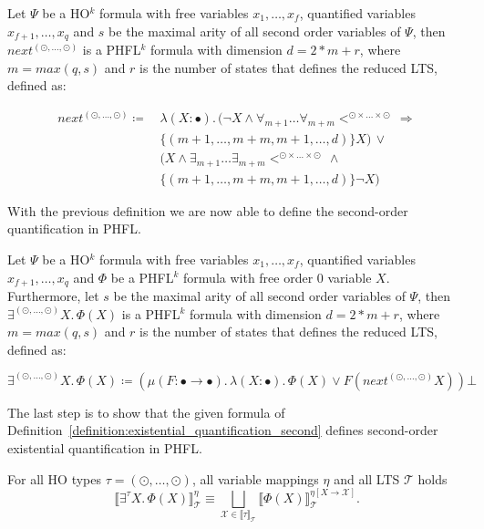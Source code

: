 \begin{definition}
    \label{definition:lower_bounds_next_second}
    Let $\Psi$ be a HO$^k$ formula with free variables $x_1, \dots, x_f$, quantified variables $x_{f+1}, \dots,
    x_q$ and $s$ be the maximal arity of all second order variables of $\Psi$, then $next^{(\odot, \dots, \odot)}$
    is a PHFL$^k$ formula with dimension $d = 2 * m + r$, where $m = max({q, s})$ and $r$ is the number of states that defines the reduced LTS, defined as:

    \begin{align*}
        next^{(\odot, \dots, \odot)} \coloneqq &\,\lambda (X \colon \bullet).\, (\neg X \wedge \forall_{m +
        1}\dots\forall_{m + m}<^{\odot \times \dots \times \odot}\, \Rightarrow \\&\,\{(m +
        1, \dots, m + m, m + 1, \dots, d)\} X) \,\vee \\&\,(X \wedge \exists_{m + 1}\dots\exists_{m + m} <^{\odot
        \times \dots \times \odot} \,\wedge \\&\,\{(m + 1, \dots, m + m, m + 1, \dots, d)\}
        \neg X)
    \end{align*}
\end{definition}

With the previous definition we are now able to define the second-order quantification in PHFL.

\begin{definition}
    \label{definition:existential_quantification_second}
    Let $\Psi$ be a HO$^k$ formula with free variables $x_1, \dots, x_f$, quantified variables $x_{f+1}, \dots,
    x_q$ and $\Phi$ be a PHFL$^k$ formula with free order $0$ variable $X$. Furthermore, let $s$ be the maximal arity
    of all second order variables of $\Psi$, then $\exists^{(\odot, \dots, \odot)}X .\,\Phi(X)$
    is a PHFL$^k$ formula with dimension $d = 2 * m + r$, where $m = max({q, s})$ and $r$ is the number of states that defines the reduced LTS, defined as:

    \[\exists^{(\odot, \dots, \odot)}X.\, \Phi(X) \coloneqq (\mu (F \colon \bullet \rightarrow \bullet).\, \lambda (X
    \colon \bullet).\, \Phi(X) \vee F(next^{(\odot, \dots, \odot)} X)) \bot
    \]
\end{definition}

The last step is to show that the given formula of Definition~\ref{definition:existential_quantification_second} defines
second-order existential quantification in PHFL.

\begin{lemma}
    \label{lemma:existential_quantifier_second}
    For all HO types $\tau = (\odot, \dots, \odot)$, all variable mappings $\eta$ and all LTS $\mathcal{T}$ holds
    \[\llbracket \exists^\tau X.\,\Phi(X)\rrbracket^\eta_\mathcal{T} \equiv \underset{\mathcal{X} \in \llbracket \tau
    \rrbracket_\mathcal{T}}{\bigsqcup} \llbracket \Phi(X) \rrbracket^{\eta[X\rightarrow \mathcal{X}]}_\mathcal{T}.\]
\end{lemma}

